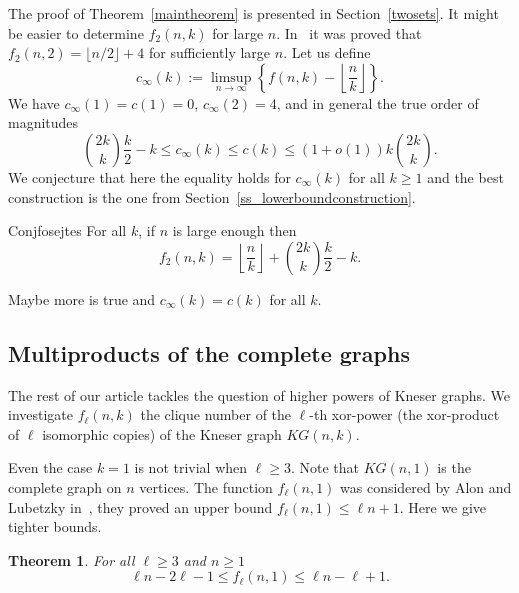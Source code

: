 \documentclass[12pt,a4paper]{amsart}
\numberwithin{equation}{section}
\theoremstyle{plain}
\newtheorem{Th}{Theorem}[section]
\theoremstyle{definition}
\newcommand{\trivup}{\left\lfloor\frac{n}{k}\right\rfloor}
\newcommand{\andris}[1]{{\color{magenta}[{ \textbf{Andris:}  #1}]\marginpar{\color{magenta}*}}}
\newcommand{\adam}[1]{{\color{cyan}[{ \textbf{Ádám:}  #1}]\marginpar{\color{cyan}*}}}
\newcommand{\NN}{n}
\begin{document}
The proof of Theorem~\ref{maintheorem} is presented in Section~\ref{twosets}.
It might be easier to determine $f_2(\NN,k)$ for large $\NN$.
In~\cite{imolay2021clique} it was proved that $f_2(\NN,2)=\lfloor{\NN/2}\rfloor +4$ for sufficiently large $\NN$.
Let us define
  $$c_\infty(k):=\limsup_{\NN\to \infty} \left\{f(\NN,k)-\trivup\right\}.$$
We have $c_\infty(1)=c(1)=0$, $c_\infty(2)=4$, and in general the true order of magnitudes
\begin{equation*}\label{eq122}
    \binom{2k}{k}\frac{k}{2}-k \leq c_\infty(k) \leq c(k)\leq (1+o(1))k\binom{2k}{k}.
\end{equation*}
We conjecture that here the equality holds for $ c_\infty(k)$ for all $k\geq 1$ and the best construction is the one from Section~\ref{ss_lowerboundconstruction}.

\begin{restatable}
{Conj}{fosejtes} \label{conj_exact}
For all $k$, if $\NN$ is large enough then
$$f_2(\NN,k)=\trivup+\binom{2k}{k}\frac{k}{2}-k. $$
\end{restatable}

Maybe more is true and $c_\infty(k) = c(k)$ for all $k$.



\subsection{Multiproducts of the complete graphs} \label{ss_13}


The rest of our article tackles the question of higher powers of Kneser graphs. We investigate $f_\ell(\NN,k)$ the clique number of the $\ell$-th xor-power (the xor-product of $\ell$ isomorphic copies) of the Kneser graph $KG(\NN,k)$.

Even the case $k=1$ is not trivial when $\ell  \geq 3$.
Note that $KG(\NN,1)$ is the complete graph on $\NN$ vertices.
The function $f_\ell(\NN,1)$ was considered by Alon and Lubetzky in~\cite{xorproduct}, they proved an upper bound $f_\ell (\NN,1)\leq \ell \NN+1$.
Here we give tighter bounds.

\begin{Th}\label{th_1}
For all $\ell \geq 3$ and $\NN \geq 1$
$$\ell\NN- 2\ell-1 \leq f_\ell(\NN,1)\leq \ell\NN-\ell+1.$$
\end{Th}
\end{document}

